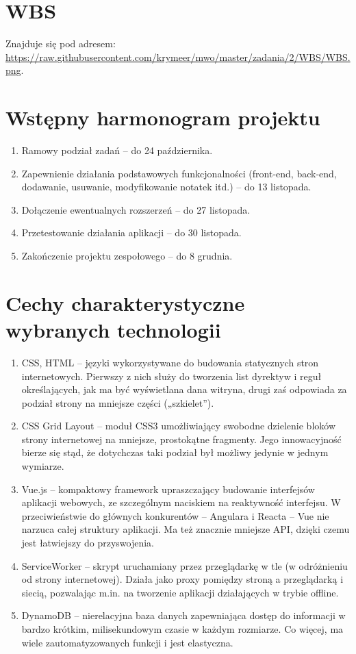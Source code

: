 \documentclass[a4paper,11pt]{article}
\begin{document}
  \section{WBS} 
  Znajduje się pod adresem:\newline
  \url{https://raw.githubusercontent.com/krymeer/mwo/master/zadania/2/WBS/WBS.png}.

  \section{Wstępny harmonogram projektu}
  \begin{enumerate}
    \item Ramowy podział zadań -- do 24 października. 
    \item Zapewnienie działania podstawowych funkcjonalności (front-end, back-end, dodawanie, usuwanie, modyfikowanie notatek itd.) -- do 13 listopada. 
    \item Dołączenie ewentualnych rozszerzeń -- do 27 listopada. 
    \item Przetestowanie działania aplikacji -- do 30 listopada. 
    \item Zakończenie projektu zespołowego -- do 8 grudnia.
  \end{enumerate}

  \section{Cechy charakterystyczne wybranych technologii}
  \begin{enumerate}
    \item CSS, HTML -- języki wykorzystywane do budowania statycznych stron internetowych. Pierwszy z nich służy do tworzenia list dyrektyw i reguł określających, jak ma być wyświetlana dana witryna, drugi zaś odpowiada za podział strony na mniejsze części („szkielet”). 
    \item CSS Grid Layout -- moduł CSS3 umożliwiający swobodne dzielenie bloków strony internetowej na mniejsze, prostokątne fragmenty. Jego innowacyjność bierze się stąd, że dotychczas taki podział był możliwy jedynie w jednym wymiarze. 
    \item Vue.js -- kompaktowy framework upraszczający budowanie interfejsów aplikacji webowych, ze szczególnym naciskiem na reaktywność interfejsu. W przeciwieństwie do głównych konkurentów -- Angulara i Reacta -- Vue nie narzuca całej struktury aplikacji. Ma też znacznie mniejsze API, dzięki czemu jest łatwiejszy do przyswojenia. 
    \item ServiceWorker -- skrypt uruchamiany przez przeglądarkę w tle (w odróżnieniu od strony internetowej). Działa jako proxy pomiędzy stroną a przeglądarką i siecią, pozwalając m.in. na tworzenie aplikacji działających w trybie offline. 
    \item DynamoDB -- nierelacyjna baza danych zapewniająca dostęp do informacji w bardzo krótkim, milisekundowym czasie  w każdym rozmiarze. Co więcej, ma wiele zautomatyzowanych funkcji i jest elastyczna.
  \end{enumerate}
\end{document}
